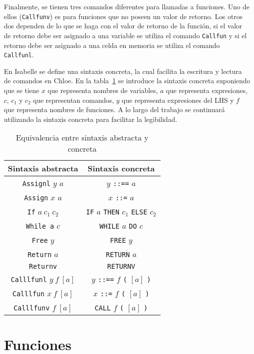 Finalmente, se tienen tres comandos diferentes para llamadas a funciones.
Uno de ellos (\verb|Callfunv|) es para funciones que no poseen un valor de retorno.
Los otros dos dependen de lo que se haga con el valor de retorno de la función, si el valor de retorno debe ser asignado a una variable se utiliza el comando \verb|Callfun| y si el retorno debe ser asignado a una celda en memoria se utiliza el comando \verb|Callfunl|.

En Isabelle se define una sintaxis concreta, la cual facilita la escritura y lectura de comandos en Chloe.
En la tabla~\ref{tab:concrete_syntax} se introduce la sintaxis concreta suponiendo que se tiene $x$ que representa nombres de variables, $a$ que representa expresiones, $c$, $c_1$ y $c_2$ que representan comandos, $y$ que representa expresiones del LHS y $f$ que representa nombres de funciones.
A lo largo del trabajo se continuará utilizando la sintaxis concreta para facilitar la legibilidad.

\begin{table}[h!]
\centering
\begin{tabular}{|c|c|}
  \hline
  \textbf{Sintaxis abstracta} & \textbf{Sintaxis concreta} \\ [0.5ex]
  \hline \hline
  \verb|Assignl| $y$ $a$ & $y$ \verb|::==| $a$ \\
  \verb|Assign| $x$ $a$ & $x$ \verb|::=| $a$ \\
  \verb|If| $a\ c_{1}\ c_{2}$ & \verb|IF| $a$ \verb|THEN| $c_{1}$ \verb|ELSE| $c_{2}$ \\
  \verb|While a| $c$ & \verb|WHILE| $a$ \verb|DO| $c$ \\
  \verb|Free| $y$ & \verb|FREE| $y$ \\
  \verb|Return| $a$ & \verb|RETURN| $a$ \\
  \verb|Returnv| & \verb|RETURNV| \\
  \verb|Calllfunl| $y\ f\ [a]$ & $y$ \verb|::==| $f$ \verb|(| $[a]$ \verb|)| \\
  \verb|Calllfun| $x\ f\ [a]$ & $x$ \verb|::=| $f$ \verb|(| $[a]$ \verb|)| \\
  \verb|Calllfunv| $f\ [a]$ & \verb|CALL| $f$ \verb|(| $[a]$ \verb|)| \\
  \hline
\end{tabular}

\caption{Equivalencia entre sintaxis abstracta y concreta}
\label{tab:concrete_syntax}
\end{table}


\section{Funciones}\label{section:functions_commands}

